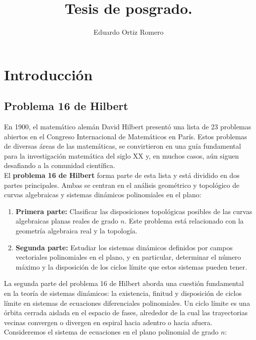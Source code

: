 \documentclass[12pt, a4paper]{report}
\title{Tesis de posgrado.}
\author{Eduardo Ortiz Romero}
\begin{document}
\maketitle
\tableofcontents

\chapter{Introducción}

\section{Problema 16 de Hilbert}
En 1900, el matemático alemán David Hilbert presentó una lista de 23 problemas abiertos en el Congreso Internacional de Matemáticos en París. Estos problemas de diversas áreas de las matemáticas, se convirtieron en una guía fundamental para la investigación matemática del siglo XX y, en muchos casos, aún siguen desafiando a la comunidad científica.\\

El \textbf{problema 16 de Hilbert}  forma parte de esta lista y está dividido en dos partes principales. Ambas se centran en el análisis geométrico y topológico de curvas algebraicas y sistemas dinámicos polinomiales en el plano:

\begin{enumerate}
	\item \textbf{Primera parte:} Clasificar las disposiciones topológicas posibles de las curvas algebraicas planas reales de grado $n$. Este problema está relacionado con la geometría algebraica real y la topología.
	\item \textbf{Segunda parte:} Estudiar los sistemas dinámicos definidos por campos vectoriales polinomiales en el plano, y en particular, determinar el número máximo y la disposición de los ciclos límite que estos sistemas pueden tener.
\end{enumerate}

La segunda parte del problema 16 de Hilbert aborda una cuestión fundamental en la teoría de sistemas dinámicos: la existencia, finitud y disposición de ciclos límite en sistemas de ecuaciones diferenciales polinomiales. Un ciclo límite es una órbita cerrada aislada en el espacio de fases, alrededor de la cual las trayectorias vecinas convergen o divergen en espiral hacia adentro o hacia afuera.\\

Consideremos el sistema de ecuaciones  en el plano polinomial de grado $n$:
\end{document}
